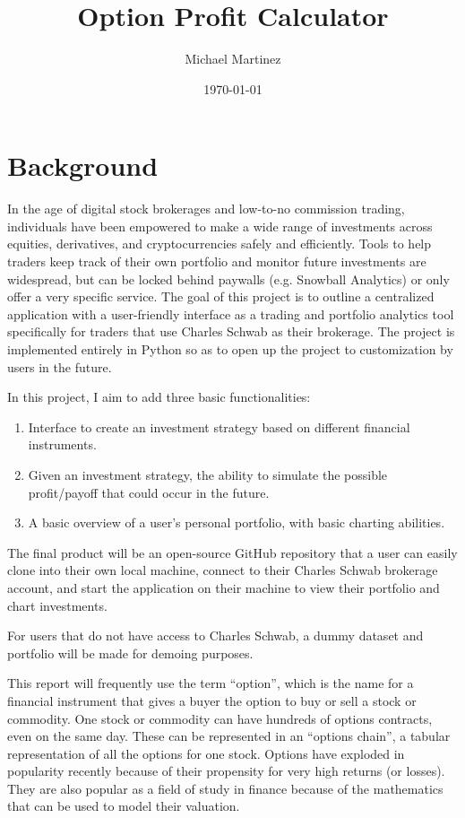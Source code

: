 \documentclass{article}
\title{Option Profit Calculator}
\author{Michael Martinez}
\date{\today} %
\begin{document}
\maketitle

\section{Background}
\indent In the age of digital stock brokerages and low-to-no commission trading, individuals have been empowered to make a wide range of investments across equities, derivatives, and cryptocurrencies safely and efficiently. Tools to help traders keep track of their own portfolio and monitor future investments are widespread, but can be locked behind paywalls (e.g. Snowball Analytics) or only offer a very specific service. The goal of this project is to outline a centralized application with a user-friendly interface as a trading and portfolio analytics tool specifically for traders that use Charles Schwab as their brokerage. The project is implemented entirely in Python so as to open up the project to customization by users in the future. 

\indent In this project, I aim to add three basic functionalities: 
\begin{enumerate}
    \item Interface to create an investment strategy based on different financial instruments.
    \item Given an investment strategy, the ability to simulate the possible profit/payoff that could occur in the future.
    \item A basic overview of a user's personal portfolio, with basic charting abilities.
\end{enumerate}

The final product will be an open-source GitHub repository that a user can easily clone into their own local machine, connect to their Charles Schwab brokerage account, and start the application on their machine to view their portfolio and chart investments. 

\indent For users that do not have access to Charles Schwab, a dummy dataset and portfolio will be made for demoing purposes. 

\indent This report will frequently use the term \enquote{option}, which is the name for a financial instrument that gives a buyer the option to buy or sell a stock or commodity. One stock or commodity can have hundreds of options contracts, even on the same day. These can be represented in an \enquote{options chain}, a tabular representation of all the options for one stock. Options have exploded in popularity recently because of their propensity for very high returns (or losses). They are also popular as a field of study in finance because of the mathematics that can be used to model their valuation. 
\end{document}
